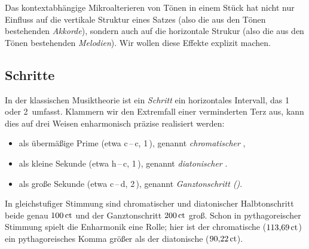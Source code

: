 Das kontextabhängige Mikroalterieren von Tönen in einem Stück hat nicht nur
Einfluss auf die vertikale Struktur eines Satzes (also die aus den Tönen
bestehenden \emph{Akkorde}), sondern auch auf die horizontale Strukur (also die
aus den Tönen bestehenden \emph{Melodien}). Wir wollen diese Effekte explizit
machen.

\subsection{Schritte}
\label{sec:steps}

In der klassischen Musiktheorie ist ein \emph{Schritt} ein horizontales
Intervall, das 1\, oder 2\, umfasst.  Klammern wir den
Extremfall einer verminderten Terz aus, kann dies auf drei Weisen enharmonisch
präzise realisiert werden:
\begin{itemize}[itemsep=0em]
\item als übermäßige Prime (etwa c\,–\,\sharp c, 1\,), genannt
  \emph{chromatischer },
\item als kleine Sekunde (etwa h\,–\,c, 1\,), genannt
  \emph{diatonischer }.
\item als große Sekunde (etwa c\,–\,d, 2\,), genannt
  \emph{Ganztonschritt ()}.
\end{itemize}
In gleichstufiger Stimmung sind chromatischer und diatonischer Halbtonschritt
beide genau $100\,\text{ct}$ und der Ganztonschritt $200\,\text{ct}$ groß.  Schon in
pythagoreischer Stimmung spielt die Enharmonik eine Rolle; hier ist der
chromatische  ($113{,}69\,\text{ct}$) ein pythagoreisches Komma größer als der
diatonische ($90{,}22\,\text{ct}$).

